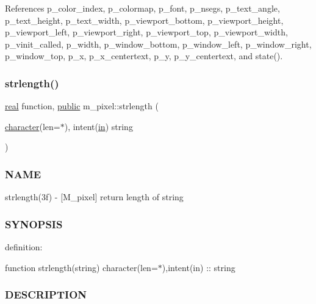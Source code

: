 References p\+\_\+color\+\_\+index, p\+\_\+colormap, p\+\_\+font, p\+\_\+nsegs, p\+\_\+text\+\_\+angle, p\+\_\+text\+\_\+height, p\+\_\+text\+\_\+width, p\+\_\+viewport\+\_\+bottom, p\+\_\+viewport\+\_\+height, p\+\_\+viewport\+\_\+left, p\+\_\+viewport\+\_\+right, p\+\_\+viewport\+\_\+top, p\+\_\+viewport\+\_\+width, p\+\_\+vinit\+\_\+called, p\+\_\+width, p\+\_\+window\+\_\+bottom, p\+\_\+window\+\_\+left, p\+\_\+window\+\_\+right, p\+\_\+window\+\_\+top, p\+\_\+x, p\+\_\+x\+\_\+centertext, p\+\_\+y, p\+\_\+y\+\_\+centertext, and state().

\mbox{\label{namespacem__pixel_a0468f8d9308bade7f8f2a68a133271d2}} 
\subsubsection{\texorpdfstring{strlength()}{strlength()}}
{\footnotesize\ttfamily \hyperlink{read__watch_83_8txt_abdb62bde002f38ef75f810d3a905a823}{real} function, \hyperlink{M__stopwatch_83_8txt_a2f74811300c361e53b430611a7d1769f}{public} m\+\_\+pixel\+::strlength (\begin{DoxyParamCaption}\item[{\hyperlink{option__stopwatch_83_8txt_abd4b21fbbd175834027b5224bfe97e66}{character}(len=$\ast$), intent(\hyperlink{M__journal_83_8txt_afce72651d1eed785a2132bee863b2f38}{in})}]{string }\end{DoxyParamCaption})}



\subsubsection*{N\+A\+ME}

strlength(3f) -\/ \mbox{[}M\+\_\+pixel\mbox{]} return length of string 

\subsubsection*{S\+Y\+N\+O\+P\+S\+IS}

definition\+:

function strlength(string) character(len=$\ast$),intent(in) \+:\+: string

\subsubsection*{D\+E\+S\+C\+R\+I\+P\+T\+I\+ON}

